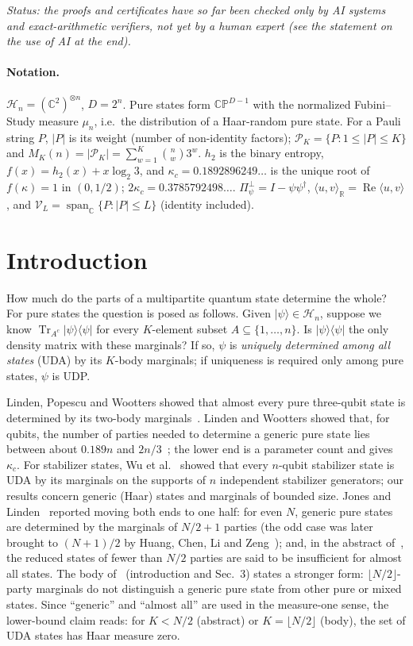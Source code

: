 \documentclass[aps,pra,onecolumn,superscriptaddress,nofootinbib,longbibliography,10pt]{revtex4-2}
\theoremstyle{definition}
\newcommand{\CC}{\mathbb C}
\newcommand{\RR}{\mathbb R}
\newcommand{\CP}{\mathbb{CP}}
\newcommand{\Tr}{\operatorname{Tr}}
\newcommand{\spanC}{\operatorname{span}_{\CC}}
\newcommand{\Pperp}{\Pi^{\perp}_{\psi}}
\newcommand{\kc}{\kappa_c}
\begin{document}
\noindent\textit{Status: the proofs and certificates have so far been checked only by AI systems and exact-arithmetic verifiers, not yet by a human expert (see the statement on the use of AI at the end).}


\paragraph*{Notation.} $\mathcal H_n=(\CC^2)^{\otimes n}$, $D=2^n$. Pure states form $\CP^{D-1}$ with the normalized Fubini--Study measure $\mu_n$, i.e.\ the distribution of a Haar-random pure state. For a Pauli string $P$, $|P|$ is its weight (number of non-identity factors); $\mathcal P_K=\{P:1\le|P|\le K\}$ and $M_K(n)=|\mathcal P_K|=\sum_{w=1}^{K}\binom nw 3^w$. $h_2$ is the binary entropy, $f(x)=h_2(x)+x\log_2 3$, and $\kc=0.1892896249\ldots$ is the unique root of $f(\kappa)=1$ in $(0,1/2)$; $2\kc=0.3785792498\ldots$. $\Pperp=I-\psi\psi^\dagger$, $\langle u,v\rangle_{\RR}=\operatorname{Re}\langle u,v\rangle$, and $\mathcal V_L=\spanC\{P:|P|\le L\}$ (identity included).

\section{Introduction}

How much do the parts of a multipartite quantum state determine the whole? For pure states the question is posed as follows. Given $|\psi\rangle\in\mathcal H_n$, suppose we know $\Tr_{A^c}|\psi\rangle\langle\psi|$ for every $K$-element subset $A\subseteq\{1,\dots,n\}$. Is $|\psi\rangle\langle\psi|$ the only density matrix with these marginals? If so, $\psi$ is \emph{uniquely determined among all states} (UDA) by its $K$-body marginals; if uniqueness is required only among pure states, $\psi$ is UDP.

Linden, Popescu and Wootters showed that almost every pure three-qubit state is determined by its two-body marginals~\cite{LPW02}. Linden and Wootters showed that, for qubits, the number of parties needed to determine a generic pure state lies between about $0.189n$ and $2n/3$~\cite{LW02}; the lower end is a parameter count and gives $\kc$. For stabilizer states, Wu et al.~\cite{Wu15} showed that every $n$-qubit stabilizer state is UDA by its marginals on the supports of $n$ independent stabilizer generators; our results concern generic (Haar) states and marginals of bounded size. Jones and Linden~\cite{JL05} reported moving both ends to one half: for even $N$, generic pure states are determined by the marginals of $N/2+1$ parties (the odd case was later brought to $(N+1)/2$ by Huang, Chen, Li and Zeng~\cite{HCLZ18}); and, in the abstract of~\cite{JL05}, the reduced states of fewer than $N/2$ parties are said to be insufficient for almost all states. The body of~\cite{JL05} (introduction and Sec.~3) states a stronger form: $\lfloor N/2\rfloor$-party marginals do not distinguish a generic pure state from other pure or mixed states. Since ``generic'' and ``almost all'' are used in the measure-one sense, the lower-bound claim reads: for $K<N/2$ (abstract) or $K=\lfloor N/2\rfloor$ (body), the set of UDA states has Haar measure zero.
\end{document}
